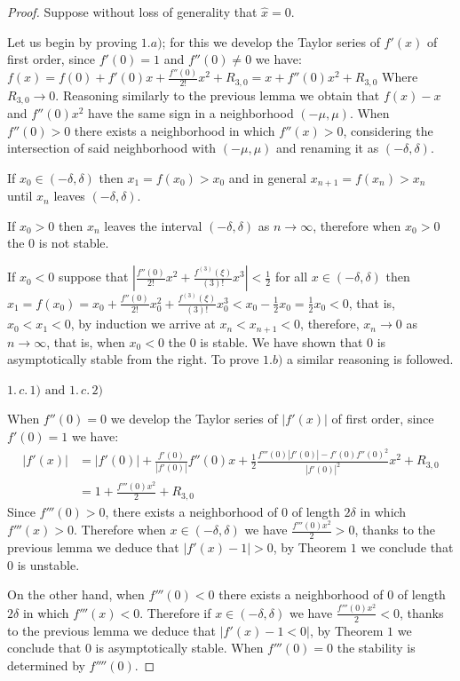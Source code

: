 \documentclass[12pt,a4paper]{report}
\theoremstyle{definition}
\begin{document}
\begin{proof}
Suppose without loss of generality that $\hat{x} = 0$.

Let us begin by proving $1.a)$; for this we develop the Taylor series of $f'(x)$ of first order, since $f'(0) = 1$ and $f''(0) \neq 0$ we have:
$
f(x) = f(0) + f'(0)x + \frac{f''(0)}{2!}x^2 +  R_{3,0} = x + f''(0)x^2  + R_{3,0}
$
%
Where $R_{3,0} \to 0$. Reasoning similarly to the previous lemma we obtain that $f(x) - x$ and $f''(0)x^2$ have the same sign in a neighborhood $(-\mu,\mu)$.
When $f''(0) > 0$ there exists a neighborhood in which $f''(x) > 0$, considering the intersection of said neighborhood with $(-\mu,\mu)$ and renaming it as $(-\delta,\delta)$.

If $x_0 \in (-\delta,\delta)$ then $x_1 = f(x_0) > x_0$ and in general $x_{n+1} = f(x_n) > x_n$ until $x_n$ leaves $(-\delta,\delta)$. 

If $x_0 > 0$ then $x_n$ leaves the interval $(-\delta,\delta)$ as $n \to \infty$, therefore when $x_0 > 0$ the $0$ is not stable.

If $x_0 < 0$ suppose that $|\frac{f''(0)}{2!}x^2 + \frac{f^{(3)}(\xi)}{(3)!}x^{3} | < \frac{1}{2}$ for all $x \in (-\delta,\delta)$ then $x_1 = f(x_0) = x_0 + \frac{f''(0)}{2!}x_{0}^2 + \frac{f^{(3)}(\xi)}{(3)!}x_{0}^{3} < x_0 - \frac{1}{2} x_0  =\frac{1}{2} x_0  < 0$, that is, $x_0 < x_1 < 0$, by induction we arrive at $x_n < x_{n + 1} < 0$, therefore, $x_n \to 0$ as $n \to \infty$, that is, when $x_0 < 0$ the $0$ is stable. We have shown that $0$ is asymptotically stable from the right. To prove $1.b)$ a similar reasoning is followed.

$1.\,c.\,1) \text{ and } 1.\,c.\,2)$

When $f''(0) = 0$ we develop the Taylor series of $|f'(x)|$ of first order, since $f'(0) = 1$ we have:
\[
\begin{split}
|f'(x)| &= |f'(0)| + \frac{f'(0)}{|f'(0)|} f''(0)x  + \frac{1}{2} \frac{f'''(0) |f'(0)| - f'(0) f''(0)^2}{|f'(0)|^2} x^2  +   R_{3,0} \\& = 1 + \frac{f'''(0)x^2}{2} +  R_{3,0}
\end{split}
\]
%
Since $f'''(0) > 0$, there exists a neighborhood of $0$ of length $2 \delta$ in which $f'''(x) > 0$. Therefore when $x \in (- \delta, \delta)$ we have $\frac{f'''(0)x^2}{2} > 0$, thanks to the previous lemma we deduce that $|f'(x) - 1 |> 0$, by Theorem $1$ we conclude that $0$ is unstable.


On the other hand, when $f'''(0) < 0$ there exists a neighborhood of $0$ of length $2 \delta$ in which $f'''(x) < 0$. Therefore if $x \in (-\delta,\delta)$ we have $\frac{f'''(0)x^2}{2} < 0$, thanks to the previous lemma we deduce that $|f'(x) - 1 < 0|$, by Theorem $1$ we conclude that $0$ is asymptotically stable. When $f'''(0) = 0$ the stability is determined by $f''''(0)$.


\end{proof}
\end{document}
